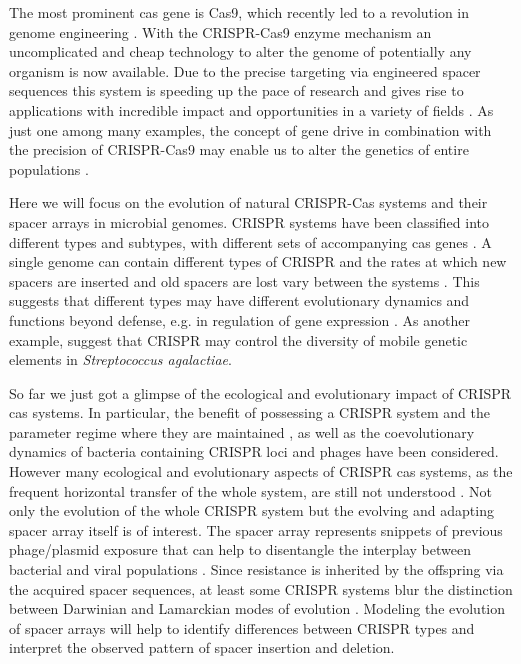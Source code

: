 \documentclass[preprint,authoryear]{elsarticle}
\theoremstyle{definition}
\numberwithin{equation}{section}
\numberwithin{figure}{section}
\begin{document}
The most prominent cas gene is Cas9, which recently led to a
revolution in genome engineering \citep{Doudna2014,Hsu2014}.  With the
CRISPR-Cas9 enzyme mechanism an uncomplicated and cheap technology to
alter the genome of potentially any organism is now available.  Due to
the precise targeting via engineered spacer sequences this system is
speeding up the pace of research and gives rise to applications with
incredible impact and opportunities in a variety of fields
\citep{Doudna2014}.
As just one among many examples, the concept of gene drive
\citep{Burt2003} in combination with the precision of CRISPR-Cas9 may
enable us to alter the genetics of entire populations
\citep{Esvelt2014,Oye2014}.
 

Here we will focus on the evolution of natural CRISPR-Cas systems and
their spacer arrays in microbial genomes.  CRISPR systems have been
classified into different types and subtypes, with different sets of
accompanying cas genes
\citep{Makarova2011classification,Makarova2015}.  A single genome can
contain different types of CRISPR and the rates at which new spacers
are inserted and old spacers are lost vary between the systems
\citep{Horvath2008}.
This suggests that different types may have different evolutionary
dynamics and functions beyond defense, e.g. in regulation of gene
expression \citep{Westra2014}.  As another example,
\cite{Lopez-Sanchez2012} suggest that CRISPR may control the
diversity of mobile genetic elements in \emph{Streptococcus
  agalactiae}.
 

So far we just got a glimpse of the ecological and evolutionary impact
of CRISPR cas systems.  In particular, the benefit of possessing a
CRISPR system and the parameter regime where they are maintained
\citep{Levin2010,Weinberger2012}, as well as the coevolutionary
dynamics of bacteria containing CRISPR loci and phages
\citep{Koskella2014,Han2017} have been considered.  However many
ecological and evolutionary aspects of CRISPR cas systems, as the
frequent horizontal transfer of the whole system, are still not
understood \citep{Rath2015}.
Not only the evolution of the whole CRISPR system but the evolving and
adapting spacer array itself is of interest.  The spacer array
represents snippets of previous phage/plasmid exposure that can help
to disentangle the interplay between bacterial and viral populations
\citep{Childs2014,Sun2015}.  Since resistance is inherited by the
offspring via the acquired spacer sequences, at least some CRISPR
systems blur the distinction between Darwinian and Lamarckian modes of
evolution \citep{Koonin2016}.
Modeling the evolution of spacer arrays will help to identify
differences between CRISPR types and interpret the observed pattern of
spacer insertion and deletion.
 
\end{document}
